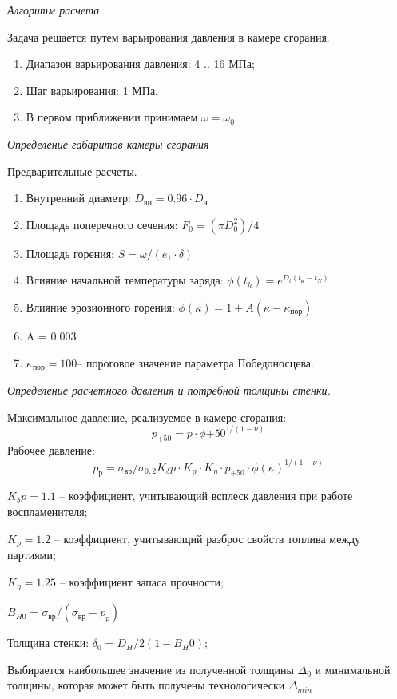 \emph{Алгоритм расчета}

Задача решается путем варьирования давления в камере сгорания.
\begin{enumerate} 
	\item Диапазон варьирования давления: 					4 .. 16 МПа;
	\item Шаг варьирования:							1 МПа.
	\item В первом приближении принимаем $\omega = \omega_0$.
\end{enumerate}

\emph{Определение габаритов камеры сгорания}

Предварительные расчеты.
\begin{enumerate}
	\item Внутренний диаметр:				$D_\text{вн}=0.96 \cdot D_\text{н}$
	\item Площадь поперечного сечения:			$F_0=(\pi D_0^2)/4$
	\item Площадь горения:					$S=\omega/(e_1 \cdot \delta)$
	\item Влияние начальной температуры заряда:	$\phi(t_h)=e^{D_t (t_\text{н}-t_N)}$
	\item Влияние эрозионного горения:			$\phi(\kappa)=1+A(\kappa-\kappa_\text{пор} )$
	\item A = 0.003
	\item $\kappa_\text{пор}=100 $– пороговое значение параметра Победоносцева.
\end{enumerate}

\emph{Определение расчетного давления и потребной толщины стенки.}

Максимальное давление, реализуемое в камере сгорания:
$$p_{+50}=p \cdot \phi{+50}^{1/(1-\nu)}$$
Рабочее давление:
$$p_\text{р}=\sigma_\text{вр}/\sigma_{0,2}  K_\delta p \cdot K_\text{p} \cdot K_\eta \cdot p_{+50} \cdot \phi(\kappa)^{1/(1-\nu)}$$

$K_\delta p=1.1 $ – коэффициент, учитывающий всплеск давления при работе воспламенителя;

$K_p=1.2 $ – коэффициент, учитывающий разброс свойств топлива между партиями;

$K_\eta=1.25 $ – коэффициент запаса прочности;

$B_{H0}=  \sigma_\text{вр}/(\sigma_\text{вр}+p_p )$

Толщина стенки:			$\delta_0=D_H/2 (1-B_H0 )$;

Выбирается наибольшее значение из полученной толщины $\Delta_0$ и минимальной толщины, которая может быть получены технологически $\Delta _{min}$

